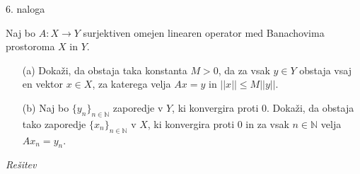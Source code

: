\documentclass[a4paper, 12pt]{article}
\newcommand{\N}{\mathbb{N}}
\begin{document}
\begin{flushleft}
6. naloga
\end{flushleft}
Naj bo $A:X\rightarrow Y$ surjektiven omejen linearen operator med Banachovima prostoroma $X$ in $Y$.
\begin{enumerate}	
\item[(a)] Dokaži, da obstaja taka konstanta $M> 0$, da za vsak $y\in Y$ obstaja vsaj en vektor $x\in X$, za katerega velja $Ax = y$ in $||x|| \le M ||y||$.
\item[(b)] Naj bo $\{y_n\}_{n\in \N}$ zaporedje v $Y$, ki konvergira proti 0. Dokaži, da obstaja tako zaporedje $\{x_n\}_{n\in \N}$ v $X$, ki konvergira proti 0 in za vsak $n\in \N$ velja $Ax_n = y_n$.
\end{enumerate}
\emph{Rešitev}
\end{document}

